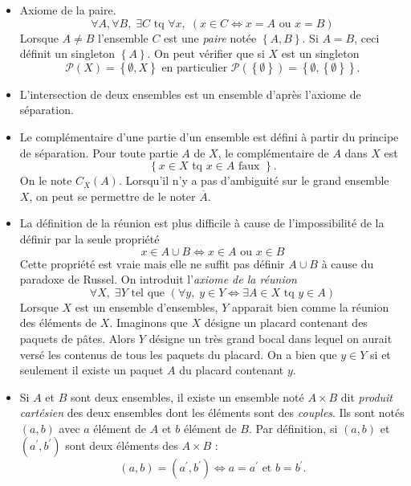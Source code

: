 \begin{itemize}
\item Axiome de la paire. 
\begin{displaymath}
  \forall A, \forall B, \; \exists C \text{ tq } \forall x,\; \left( x\in C \Leftrightarrow x = A \text{ ou } x = B \right) 
\end{displaymath}
Lorsque $A\neq B$ l'ensemble $C$ est une \emph{paire} notée $\left\lbrace A,B \right\rbrace$. Si $A=B$, ceci définit un singleton $\left\lbrace A \right\rbrace$.\newline
On peut vérifier que si $X$ est un singleton
\[
  \mathcal{P}(X) = \left\lbrace \emptyset , X\right\rbrace \text{ en particulier } 
  \mathcal{P}(\left\lbrace \emptyset \right\rbrace) = \left\lbrace \emptyset, \left\lbrace \emptyset \right\rbrace \right\rbrace. 
\]

\item L'intersection de deux ensembles est un ensemble d'après l'axiome de séparation.

\item Le complémentaire d'une partie d'un ensemble est défini à partir du principe de séparation. Pour toute partie $A$ de $X$, le complémentaire de $A$ dans $X$ est 
\[
  \left\lbrace x \in X \text{ tq } x\in A \text{ faux }\right\rbrace. 
\]
On le note $C_X(A)$. Lorsqu'il n'y a pas d'ambiguité sur le \og grand ensemble\fg~ $X$, on peut se permettre de le noter $\overline{A}$.


\item La définition de la réunion est plus difficile à cause de l'impossibilité de la définir par la seule propriété
\begin{displaymath}
  x \in A \cup B \Leftrightarrow x\in A \text{ ou } x\in B
\end{displaymath}
Cette propriété est vraie mais elle ne suffit pas définir $A\cup B$ à cause du paradoxe de Russel. On introduit l'\emph{axiome de la réunion} 
\begin{displaymath}
\forall X, \; \exists Y \text{ tel que } \left(\forall y, \; y\in Y \Leftrightarrow \exists A \in X \text{ tq } y \in A \right)   
\end{displaymath}
Lorsque $X$ est un ensemble d'ensembles, $Y$ apparait bien comme la réunion des éléments de $X$.\newline
Imaginons que $X$ désigne un placard contenant des paquets de pâtes. Alors $Y$ désigne un très grand bocal dans lequel on aurait versé les contenus de tous les paquets du placard. On a bien que $y \in Y$ si et seulement il existe un paquet $A$ du placard contenant $y$.

\item  Si $A$ et $B$ sont deux ensembles, il existe un ensemble noté $A\times B$ dit \emph{produit cartésien} des deux ensembles dont les éléments sont des \emph{couples}. Ils sont notés $(a,b)$ avec $a$ élément de $A$ et $b$ élément de $B$. Par définition, si $(a,b)$ et $(a^\prime,b^\prime )$ sont deux éléments des $A\times B$ :
\begin{displaymath}
 (a,b) = (a^\prime,b^\prime ) \Leftrightarrow a=a^\prime \text{ et } b=b^\prime.
\end{displaymath}
\end{itemize}

